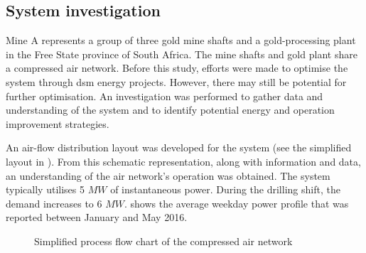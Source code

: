 \subsection{System investigation}
Mine A represents a group of three gold mine shafts and a gold-processing plant in the Free State province of South Africa. The mine shafts and gold plant share a compressed air network. Before this study, efforts were made to optimise the system through \gls{dsm} energy projects. However, there may still be potential for further optimisation. An investigation was performed to gather data and understanding of the system and to identify potential energy and operation improvement strategies.
\par 
An air-flow distribution layout was developed for the system (see the simplified layout in ). From this schematic representation, along with information and data, an understanding of the air network’s operation was obtained. The system typically utilises 5 $MW$ of instantaneous power. During the drilling shift, the demand increases to 6 $MW$.  shows the average weekday power profile that was reported between January and May 2016.\par 
\begin{figure}[h!]
	\centering
	\caption{Simplified process flow chart of the compressed air network}
	\label{fig: Beatrix Air layout}
\end{figure}
